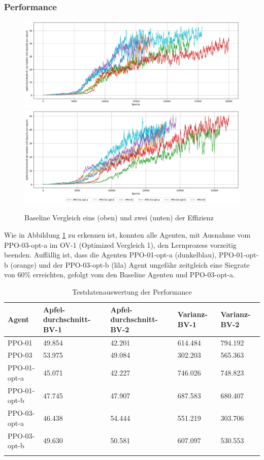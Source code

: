 \subsubsection{Performance}
\begin{figure}[H]
	\centering
	\includegraphics[scale=0.4517]{Abbildungen/Evaluation/performance-rate_optimized_01.png}
	\includegraphics[scale=0.4515]{Abbildungen/Evaluation/performance-rate_optimized_02.png}
	\caption[Optimized Vergleich Performance]{Baseline Vergleich eins (oben) und zwei (unten) der Effizienz}
	\label{fig:Optimized_Performance}
\end{figure}
Wie in Abbildung \ref{fig:Optimized_Performance} zu erkennen ist, konnten alle Agenten, mit Ausnahme vom PPO-03-opt-a im OV-1 (Optimized Vergleich 1), den Lernprozess vorzeitig beenden. Auffällig ist, dass die Agenten PPO-01-opt-a (dunkelblau), PPO-01-opt-b (orange) und der PPO-03-opt-b (lila) Agent  ungefähr zeitgleich eine Siegrate von 60\% erreichten, gefolgt vom den Baseline Agenten und PPO-03-opt-a.
\begin{longtable}[h]{|p{2.7cm}|p{3cm}|p{3cm}|p{2cm}|p{2cm}|}
	\hline
	Agent & Apfel-durchschnitt-BV-1 & Apfel-durchschnitt-BV-2 & Varianz-BV-1 & Varianz-BV-2 \\
	\hline
	PPO-01 & 49.854 & 42.201 & 614.484 & 794.192 \\
	\hline
	PPO-03 & 53.975 & 49.084 & 302.203 & 565.363 \\
	\hline
	PPO-01-opt-a & 45.071 & 42.227 & 746.026 & 748.823 \\
	\hline
	PPO-01-opt-b & 47.745 & 47.907 & 687.583 & 680.407 \\
	\hline
	PPO-03-opt-a & 46.438 & 54.444 & 551.219 & 303.706 \\
	\hline
	PPO-03-opt-b & 49.630 & 50.581 & 607.097 & 530.553 \\
	\hline
	\caption{Testdatenauswertung der Performance}
	\label{tab:Evaluation_Testdaten_Performance_Optimized} 
\end{longtable}
